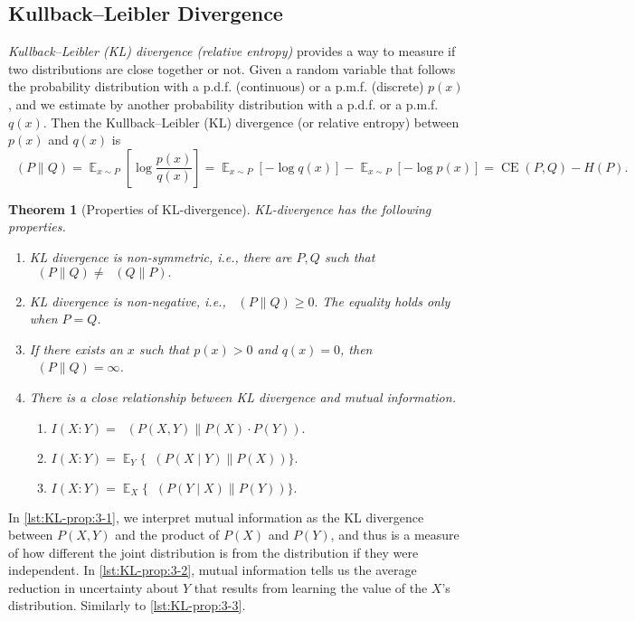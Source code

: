 \documentclass[12pt,sans]{article}
\DeclareMathOperator*{\E}{\mathbb{E}}
\DeclareMathOperator{\KL}{D_{KL}}
\DeclareMathOperator{\CE}{CE}
\newcommand{\midd}{\parallel}
\theoremstyle{definition}
\theoremstyle{plain}
\newtheorem{theorem}{Theorem}[section]
\theoremstyle{remark}
\begin{document}
\subsection{Kullback–Leibler Divergence}
\emph{Kullback–Leibler (KL) divergence (relative entropy)} provides a way to measure if two distributions are close together or not.
Given a random variable that follows the probability distribution with a p.d.f. (continuous) or a p.m.f. (discrete) $p(x)$, and we estimate by another probability distribution with a p.d.f. or a p.m.f. $q(x)$. Then the Kullback–Leibler (KL) divergence (or relative entropy) between $p(x)$ and $q(x)$ is
\[
\KL(P\parallel Q) = \E_{x \sim P} \left[ \log \frac{p(x)}{q(x)} \right] =
\E_{x \sim P} [- \log q(x)] -  \E_{x \sim P} [- \log p(x)] = \CE(P,Q) - H(P).
\]

\begin{theorem}[Properties of KL-divergence]
    KL-divergence has the following properties.
\begin{enumerate}
    \item KL divergence is non-symmetric, i.e., there are $P,Q$ such that
    $\KL(P\midd Q) \neq \KL(Q\midd P).$

    \item KL divergence is non-negative, i.e.,
    $\KL(P\midd Q) \geq 0.$
    The equality holds only when $P=Q$.

    \item If there exists an $x$ such that $p(x)>0$ and $q(x)=0$, then $\KL(P\midd Q) = \infty$.

    \item There is a close relationship between KL divergence and mutual information.
    \begin{enumerate}
    \item $I(X:Y) = \KL(P(X, Y)\midd P(X)\cdot P(Y)).$\label{lst:KL-prop:3-1}
    \item $I(X:Y) = \E_Y \{ \KL(P(X \mid Y) \midd P(X)) \}.$\label{lst:KL-prop:3-2}
    \item $I(X:Y) = \E_X \{ \KL(P(Y \mid X) \midd P(Y)) \}.$\label{lst:KL-prop:3-3}
    \end{enumerate}
\end{enumerate}
\end{theorem}
In \ref{lst:KL-prop:3-1}, we interpret mutual information as the KL divergence between $P(X,Y)$
and the product of $P(X)$ and $P(Y)$, and thus is a measure of how different the joint distribution is from the distribution if they were independent. In \ref{lst:KL-prop:3-2}, mutual information tells us the average reduction in uncertainty about $Y$ that results from learning the value of the $X$’s distribution. Similarly to \ref{lst:KL-prop:3-3}.
\end{document}
